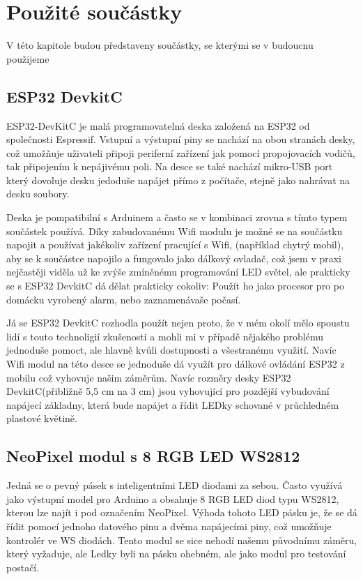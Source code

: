\chapter{Použité součástky}

V této kapitole budou představeny součástky, se kterými se v budoucnu použijeme

\section{ESP32 DevkitC}
ESP32-DevKitC je malá programovatelná deska založená na ESP32 od společnosti Espressif. Vstupní a výstupní piny se nachází na obou stranách desky, což umožňuje uživateli připoji periferní zařízení jak pomocí propojovacích vodičů, tak připojením k nepájivému poli. Na desce se také nachází mikro-USB port který dovoluje  desku jedoduše napájet přímo z počítače, stejně jako nahrávat na desku soubory. 


Deska je pompatibilní s Arduinem a často se v kombinaci zrovna s tímto typem součástek používá. Díky zabudovanému Wifi modulu je možné se na součástku napojit a používat jakékoliv zařízení pracující s Wifi, (například chytrý mobil), aby se k součástce napojilo a fungovalo jako dálkový ovladač, což jsem v praxi nejčastěji viděla už ke zvýše zmíněnému programování LED světel, ale prakticky se s ESP32 DevkitC dá dělat prakticky cokoliv: Použít ho jako procesor pro po domácku vyrobený alarm, nebo zaznamenávaše počasí. 


Já se ESP32 DevkitC rozhodla použít nejen proto, že v mém okolí mělo spoustu lidí s touto technoligií zkušenosti a mohli mi v případě nějakého problému jednoduše pomoct, ale hlavně kvůli dostupnosti a všestranému využití. Navíc Wifi modul na této desce se jednoduše dá využít pro dálkové ovládání ESP32 z mobilu což vyhovuje našim záměrům. Navíc rozměry desky ESP32 DevkitC(přibližně 5,5 cm na 3 cm) jsou vyhovující pro pozdější vybudování napájecí základny, která bude napájet a řídit LEDky schované v průchledném plastové květině.


\section{NeoPixel modul s 8 RGB LED WS2812}
Jedná se o pevný pásek s inteligentními LED diodami za sebou. Často využívá jako výstupní model pro Arduino a obsahuje 8 RGB LED diod typu WS2812, kterou lze najít i pod označením NeoPixel. Výhoda tohoto LED pásku je, že se dá řídit pomocí jednoho datového pinu a dvěma napájecími piny, což umožňuje kontrolér ve WS diodách. Tento modul se sice nehodí našemu původnímu záměru, který vyžaduje, ale Ledky byli na pásku ohebném, ale jako modul pro testování postačí.


